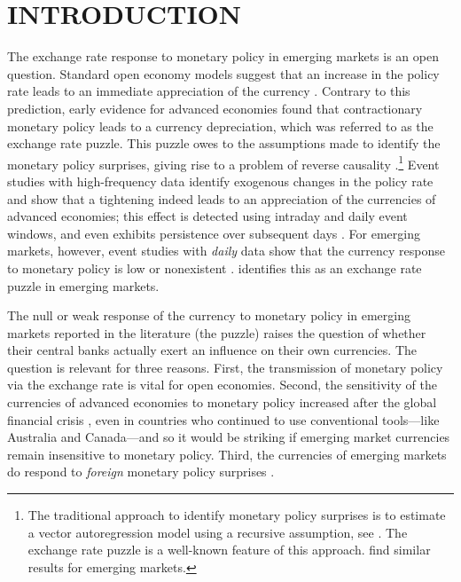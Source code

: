 
\section{INTRODUCTION}
\sectitlespace

The exchange rate response to monetary policy in emerging markets is an open question. Standard open economy models suggest that an increase in the policy rate leads to an immediate appreciation of the currency \parencite{Dornbusch:1976}. Contrary to this prediction, early evidence for advanced economies \parencite{GrilliRoubini:1995} found that contractionary monetary policy leads to a currency depreciation, which was referred to as the exchange rate puzzle. This puzzle owes to the assumptions made to identify the monetary policy surprises, giving rise to a problem of reverse causality \parencite{Zettelmeyer:2004}.\footnote{The traditional approach to identify monetary policy surprises is to estimate a vector autoregression model using a recursive assumption, see \textcite{CEE:1999}. The exchange rate puzzle is a well-known feature of this approach. \textcite{KimLim:2016} find similar results for emerging markets.} Event studies with high-frequency data identify exogenous changes in the policy rate and show that a tightening indeed leads to an appreciation of the currencies of advanced economies; this effect is detected using intraday \parencite{ABDV:2003,KearnsManners:2006,FRWW:2007} and daily \parencite{Wright:2012, FerrariKearnsSchrimpf:2021} event windows, and even exhibits persistence over subsequent days \parencite{Rosa:2011JBF, FerrariKearnsSchrimpf:2021}. For emerging markets, however, event studies with \textit{daily} data show that the currency response to monetary policy is low or nonexistent \parencite{Aktasetal:2009, Duranetal:2012,PenningsRamayandiTang:2015}. \textcite{Kohlscheen:2014} identifies this as an exchange rate puzzle in emerging markets. 

The null or weak response of the currency to monetary policy in emerging markets reported in the literature (the puzzle) raises the question of whether their central banks actually exert an influence on their own currencies. The question is relevant for three reasons. First, the transmission of monetary policy via the exchange rate is vital for open economies. Second, the sensitivity of the currencies of advanced economies to monetary policy increased after the global financial crisis \parencite{FerrariKearnsSchrimpf:2021}, even in countries who continued to use conventional tools---like Australia and Canada---and so it would be striking if emerging market currencies remain insensitive to monetary policy. Third, the currencies of emerging markets do respond to \textit{foreign} monetary policy surprises \parencite{HausmanWongswan:2011,KearnsSchrimpfXia:2018}.

